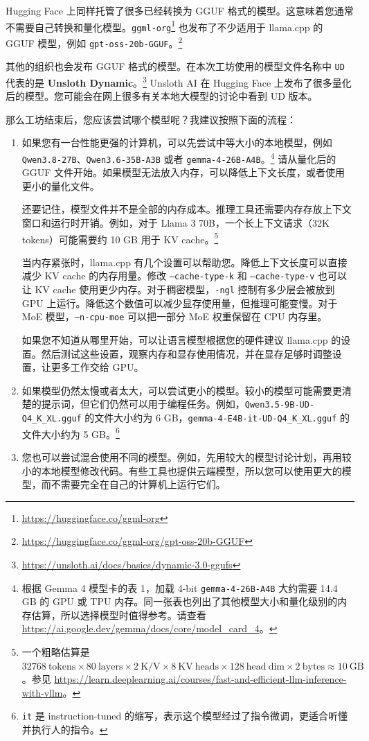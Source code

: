 \documentclass[a4paper,12pt]{article}
\begin{document}
Hugging Face 上同样托管了很多已经转换为 GGUF 格式的模型。这意味着您通常不需要自己转换和量化模型。\texttt{ggml-org}\footnote{\url{https://huggingface.co/ggml-org}} 也发布了不少适用于 llama.cpp 的 GGUF 模型，例如 \texttt{gpt-oss-20b-GGUF}。\footnote{\url{https://huggingface.co/ggml-org/gpt-oss-20b-GGUF}}

其他的组织也会发布 GGUF 格式的模型。在本次工坊使用的模型文件名称中 \texttt{UD} 代表的是 \textbf{Unsloth Dynamic}。\footnote{\url{https://unsloth.ai/docs/basics/dynamic-3.0-ggufs}} Unsloth AI 在 Hugging Face 上发布了很多量化后的模型。您可能会在网上很多有关本地大模型的讨论中看到 UD 版本。

那么工坊结束后，您应该尝试哪个模型呢？我建议按照下面的流程：

\begin{enumerate}
\item 如果您有一台性能更强的计算机，可以先尝试中等大小的本地模型，例如 \texttt{Qwen3.8-27B}、\texttt{Qwen3.6-35B-A3B} 或者 \texttt{gemma-4-26B-A4B}。\footnote{根据 Gemma 4 模型卡的表 1，加载 4-bit \texttt{gemma-4-26B-A4B} 大约需要 14.4 GB 的 GPU 或 TPU 内存。同一张表也列出了其他模型大小和量化级别的内存估算，所以选择模型时值得参考。请查看 \url{https://ai.google.dev/gemma/docs/core/model_card_4}。} 请从量化后的 GGUF 文件开始。如果模型无法放入内存，可以降低上下文长度，或者使用更小的量化文件。

还要记住，模型文件并不是全部的内存成本。推理工具还需要内存存放上下文窗口和运行时开销。例如，对于 Llama 3 70B，一个长上下文请求（32K tokens）可能需要约 10 GB 用于 KV cache。\footnote{一个粗略估算是 $32768\ \mathrm{tokens}  \times 80\ \mathrm{layers} \times 2\ \mathrm{K/V} \times 8\ \mathrm{KV\ heads} \times 128\ \mathrm{head\ dim} \times 2\ \mathrm{bytes} \approx 10\ \mathrm{GB}$。参见 \url{https://learn.deeplearning.ai/courses/fast-and-efficient-llm-inference-with-vllm}。}

当内存紧张时，llama.cpp 有几个设置可以帮助您。降低上下文长度可以直接减少 KV cache 的内存用量。修改 \texttt{--cache-type-k} 和 \texttt{--cache-type-v} 也可以让 KV cache 使用更少内存。对于稠密模型，\texttt{-ngl} 控制有多少层会被放到 GPU 上运行。降低这个数值可以减少显存使用量，但推理可能变慢。对于 MoE 模型，\texttt{--n-cpu-moe} 可以把一部分 MoE 权重保留在 CPU 内存里。

如果您不知道从哪里开始，可以让语言模型根据您的硬件建议 llama.cpp 的设置。然后测试这些设置，观察内存和显存使用情况，并在显存足够时调整设置，让更多工作交给 GPU。

\item 如果模型仍然太慢或者太大，可以尝试更小的模型。较小的模型可能需要更清楚的提示词，但它们仍然可以用于编程任务。例如，\texttt{Qwen3.5-9B-UD-Q4\_K\_XL.gguf} 的文件大小约为 6 GB，\texttt{gemma-4-E4B-it-UD-Q4\_K\_XL.gguf} 的文件大小约为 5 GB。\footnote{\texttt{it} 是 instruction-tuned 的缩写，表示这个模型经过了指令微调，更适合听懂并执行人的指令。}

\item 您也可以尝试混合使用不同的模型。例如，先用较大的模型讨论计划，再用较小的本地模型修改代码。有些工具也提供云端模型，所以您可以使用更大的模型，而不需要完全在自己的计算机上运行它们。
\end{enumerate}
\end{document}
